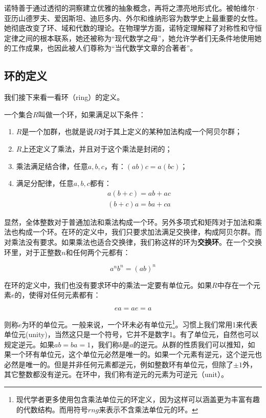 \documentclass[b5paper]{ctexart}
\begin{document}
诺特善于通过透彻的洞察建立优雅的抽象概念，再将之漂亮地形式化。被帕维尔·亚历山德罗夫、爱因斯坦、迪厄多内、外尔和维纳形容为数学史上最重要的女性。她彻底改变了环、域和代数的理论。在物理学方面，诺特定理解释了对称性和守恒定律之间的根本联系，她还被称为“现代数学之母”，她允许学者们无条件地使用她的工作成果，也因此被人们尊称为“当代数学文章的合著者”\cite{Wiki-Noether}。

\subsection{环的定义}
我们接下来看一看环（ring）的定义。

\begin{definition}
一个集合$R$叫做一个环，如果满足以下条件：
\begin{enumerate}
\item $R$是一个加群，也就是说$R$对于其上定义的某种加法构成一个阿贝尔群；
\item $R$上还定义了乘法，并且对于这个乘法是封闭的；
\item 乘法满足结合律，任意$a, b, c$，有：$(ab)c = a(bc)$；
\item 满足分配律，任意$a, b, c$都有：
\[
\begin{array}{l}
a(b + c) = ab + ac \\
(b + c)a = ba + ca
\end{array}
\]
\end{enumerate}
\end{definition}

显然，全体整数对于普通加法和乘法构成一个环。另外多项式和矩阵对于加法和乘法也构成一个环。在环的定义中，我们只要求加法满足交换律，构成阿贝尔群。而对乘法没有要求。如果乘法也适合交换律，我们称这样的环为\textbf{交换环}。在一个交换环里，对于正整数$n$和任何两个元都有：

\[
a^nb^n = (ab)^n
\]

在环的定义中，我们也没有要求环中的乘法一定要有单位元。如果$R$中存在一个元素$e$的，使得对任何元素都有：

\[
ea = ae = a
\]

则称$e$为环的单位元。一般来说，一个环未必有单位元\footnote{现代学者更多使用包含乘法单位元的环定义，因为这样可以涵盖更为丰富有趣的代数结构。而用符号$rng$来表示不含乘法单位元的环。}。习惯上我们常用1来代表单位元(unity)，当然这只是一个符号，它并不是数字1。有了单位元，自然也可以规定逆元。如果$ab = ba = 1$，我们称$b$是$a$的逆元。从群的性质我们可以推知，如果一个环有单位元，这个单位元必然是唯一的。如果一个元素有逆元，这个逆元也必然是唯一的。但是并非任何元素都逆元，例如整数环有单位元，但除了$\pm 1$外，其它整数都没有逆元。在环中，我们称有逆元的元素为可逆元（unit）。
\end{document}
